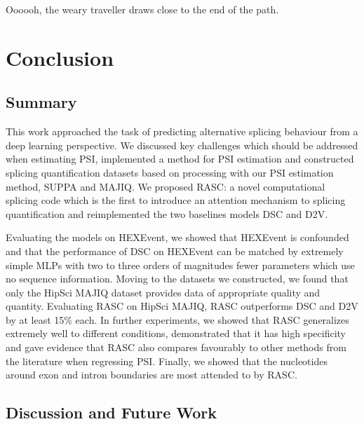 \begin{savequote}[8cm]
	
	Oooooh, the weary traveller draws close to the end of the path.
\end{savequote}

\chapter{\label{ch:6-conclusion}Conclusion} %
\section{Summary}
This work approached the task of predicting alternative splicing behaviour from a deep learning perspective.
We discussed key challenges which should be addressed when estimating PSI, implemented a method for PSI estimation and constructed splicing quantification datasets based on processing with our PSI estimation method, SUPPA and MAJIQ. We proposed RASC: a novel computational splicing code which is the first to introduce an attention mechanism to splicing quantification and reimplemented the two baselines models DSC and D2V. %

Evaluating the models on HEXEvent, we showed that HEXEvent is confounded and that the performance of DSC on HEXEvent can be matched by extremely simple MLPs with two to three orders of magnitudes fewer parameters which use no sequence information. 
Moving to the datasets we constructed, we found that only the HipSci MAJIQ dataset provides data of appropriate quality and quantity. Evaluating RASC on HipSci MAJIQ, RASC outperforms DSC and D2V by at least 15\% each. In further experiments, we showed that RASC generalizes extremely well to different conditions, demonstrated that it has high specificity and gave evidence that RASC also compares favourably to other methods from the literature when regressing PSI. Finally, we showed that the nucleotides around exon and intron boundaries are most attended to by RASC.
\section{Discussion and Future Work}
